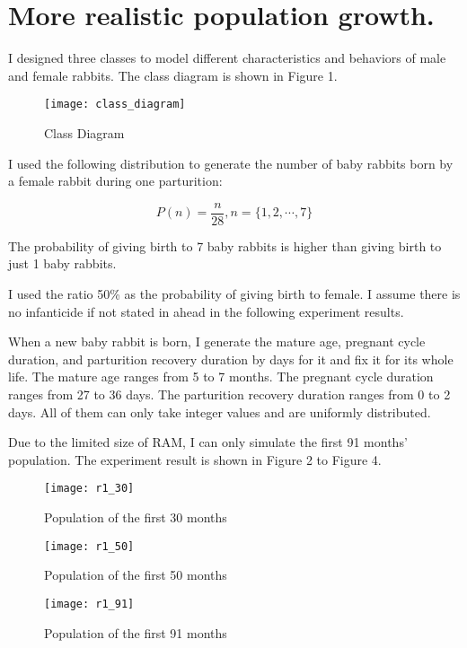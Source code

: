 \documentclass{article}
\begin{document}
    \section{More realistic population growth.}
    
    I designed three classes to model different characteristics and behaviors of male and female rabbits. The class diagram is shown in Figure 1.
    
    \begin{figure}
        \centering
        \texttt{[image: class\_diagram]}
        \caption{Class Diagram}
    \end{figure}
    
    I used the following distribution to generate the number of baby rabbits born by a female rabbit during one parturition:
    
    $$P(n)= \frac{n}{28}, n=\{1,2,\cdots,7\} $$
    
    The probability of giving birth to 7 baby rabbits is higher than giving birth to just 1 baby rabbits.
    
    I used the ratio 50\% as the probability of giving birth to female. I assume there is no infanticide if not stated in ahead in the following experiment results.
    
    When a new baby rabbit is born, I generate the mature age, pregnant cycle duration, and parturition recovery duration by days for it and fix it for its whole life. The mature age ranges from 5 to 7 months. The pregnant cycle duration ranges from 27 to 36 days. The parturition recovery duration ranges from 0 to 2 days. All of them can only take integer values and are uniformly distributed. 
    
    Due to the limited size of RAM, I can only simulate the first 91 months' population. The experiment result is shown in Figure 2 to Figure 4.
    
    \begin{figure}
        \centering
        \texttt{[image: r1\_30]}
        \caption{Population of the first 30 months}
    \end{figure}
    \begin{figure}
        \centering
        \texttt{[image: r1\_50]}
        \caption{Population of the first 50 months}
    \end{figure}
    \begin{figure}
        \centering
        \texttt{[image: r1\_91]}
        \caption{Population of the first 91 months}
    \end{figure}
    
\end{document}
